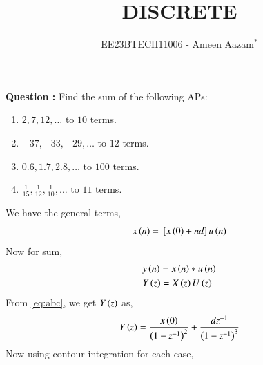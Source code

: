 \documentclass[journal,12pt,twocolumn]{IEEEtran}
\theoremstyle{remark}
\begin{document}

\vspace{3cm}

\title{DISCRETE}
\author{EE23BTECH11006 - Ameen Aazam$^{*}$%
}
\maketitle
\newpage
\bigskip

\renewcommand{\thefigure}{\theenumi}
\renewcommand{\thetable}{\theenumi}

\vspace{3cm}
\textbf{Question :}
Find the sum of the following APs:
\begin{enumerate}[label=(\alph*)]
\item $2, 7, 12, \ldots$ to $10$ terms.
\item $-37, -33, -29, \ldots$ to $12$ terms.
\item $0.6, 1.7, 2.8, \ldots$ to $100$ terms.
\item $\frac{1}{15}, \frac{1}{12}, \frac{1}{10}, \ldots$ to $11$ terms.
\end{enumerate}
\solution

We have the general terms,
\begin{align}
    x\left(n\right)={}\left[x\left(0\right)+nd\right]u\left(n\right)
\end{align}
Now for sum,
\begin{align}
    &y\left(n\right)=x\left(n\right)\ast u\left(n\right) \\
    &Y\left(z\right)=X\left(z\right)U\left(z\right)
\end{align}
From \eqref{eq:abc}, we get $Y\left(z\right)$ as,
\begin{align}
    Y\left(z\right)=\frac{x\left(0\right)}{\left(1-z^{-1}\right)^2}+\frac{dz^{-1}}{\left(1-z^{-1}\right)^3}
\end{align}
Now using contour integration for each case,
\end{document}
